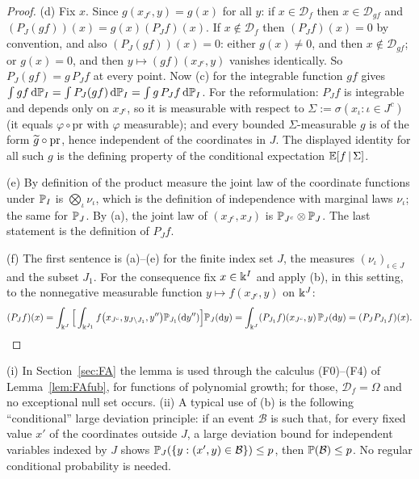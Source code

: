 \begin{proof}
(d) Fix $x$. Since $g(x_{J^c},y)=g(x)$ for all $y$: if $x\in\mathcal D_f$ then $x\in\mathcal D_{gf}$ and $(P_J(gf))(x)=g(x)(P_Jf)(x)$. If $x\notin\mathcal D_f$ then $(P_Jf)(x)=0$ by convention, and also $(P_J(gf))(x)=0$:
either $g(x)\ne0$, and then $x\notin\mathcal D_{gf}$; or $g(x)=0$, and then $y\mapsto(gf)(x_{J^c},y)$ vanishes identically. So $P_J(gf)=g\,P_Jf$ at every point. Now (c) for the integrable function $gf$ gives $\int gf\,\mathrm{d}\mathbb{P}_I=\int P_J(gf)\,\mathrm{d}\mathbb{P}_I=\int g\,P_Jf\,\mathrm{d}\mathbb{P}_I$.
For the reformulation: $P_Jf$ is integrable and depends only on $x_{J^c}$, so it is measurable with respect to $\Sigma:=\sigma(x_\iota:\iota\in J^c)$ (it equals $\varphi\circ\mathrm{pr}$ with $\varphi$ measurable);
and every bounded $\Sigma$-measurable $g$ is of the form $\widetilde g\circ\mathrm{pr}$, hence independent of the coordinates in $J$. The displayed identity for all such $g$ is the defining property of the conditional expectation $\mathbb{E}[f\,|\,\Sigma]$.

(e) By definition of the product measure the joint law of the coordinate functions under $\mathbb{P}_I$ is $\bigotimes_\iota\nu_\iota$, which is the definition of independence with marginal laws $\nu_\iota$; the same for $\mathbb{P}_J$.
By (a), the joint law of $(x_{J^c},x_J)$ is $\mathbb{P}_{J^c}\otimes\mathbb{P}_J$. The last statement is the definition of $P_Jf$.

(f) The first sentence is (a)--(e) for the finite index set $J$, the measures $(\nu_\iota)_{\iota\in J}$ and the subset $J_1$. For the consequence fix $x\in\Bbbk^I$ and apply (b), in this setting, to the nonnegative measurable function $y\mapsto f(x_{J^c},y)$ on $\Bbbk^J$:
\[
 (P_Jf)(x)=\int_{\Bbbk^{J}}\Big[\int_{\Bbbk^{J_1}}f\big(x_{J^c},y_{J\setminus J_1},y''\big)\mathbb{P}_{J_1}(\mathrm{d} y'')\Big]\mathbb{P}_J(\mathrm{d} y)=\int_{\Bbbk^J}(P_{J_1}f)(x_{J^c},y)\,\mathbb{P}_J(\mathrm{d} y)=(P_JP_{J_1}f)(x).\qedhere
\]
\end{proof}
\begin{remark}\label{rem:split}
\textup{(i)} In Section~\ref{sec:FA} the lemma is used through the calculus (F0)--(F4) of Lemma~\ref{lem:FAfub}, for functions of polynomial growth; for those, $\mathcal D_f=\Omega$ and no exceptional null set occurs.
\textup{(ii)} A typical use of \textup{(b)} is the following ``conditional'' large deviation principle: if an event $\mathcal B$ is such that, for every fixed value $x'$ of the coordinates outside $J$, a large deviation bound for independent variables indexed by $J$
shows $\mathbb{P}_J(\{y:(x',y)\in\mathcal B\})\le p$, then $\mathbb{P}(\mathcal B)\le p$. No regular conditional probability is needed.
\end{remark}
